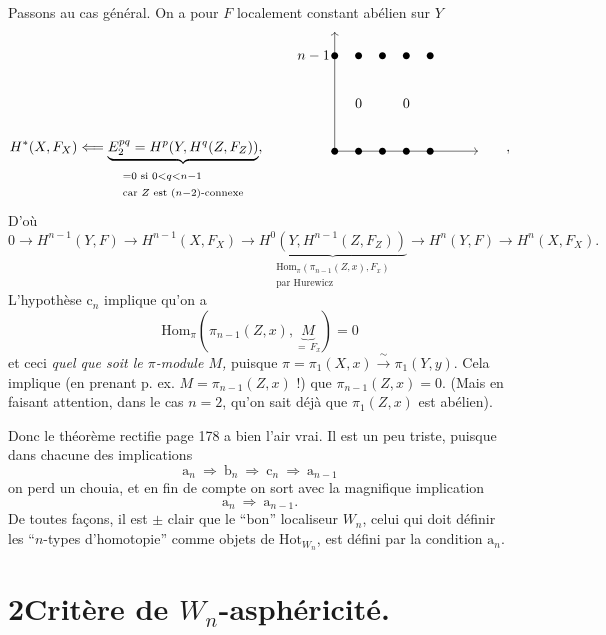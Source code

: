 \documentclass[11pt]{article}
\newcommand{\printedpage}[1]{\marginpar{\footnotesize p.~#1}}
\newcommand{\msp}[1]{\marginpar{\footnotesize [#1]}}
\begin{document}
\printedpage{124}

Passons au cas général. On a pour $F$ localement constant abélien sur $Y$
\[
H^*(X,F_X) \Longleftarrow \underbrace{E_2^{pq} = H^p(Y,H^q(Z,F_Z))}_{\begin{array}{l}\scriptstyle = 0 \text{ si } 0<q<n-1\\ \scriptstyle \text{car } Z \text{ est } (n-2)\text{-connexe}\end{array}}, \qquad
\begin{tikzpicture}[baseline=0pt, x=0.6cm, y=0.6cm]
\draw[->] (0,0) -- (0,5);
\draw[->] (0,0) -- (6,0);
\node[left] at (0,4) {$n-1$};
\foreach \i in {0,...,4} { \fill (\i,4) circle (2.5pt); \fill (\i,0) circle (2.5pt); }
\node at (1,2) {$0$};
\node at (3,2) {$0$};
\end{tikzpicture}
\qquad ,
\]
D’où
\[
0 \longrightarrow H^{n-1}(Y,F) \longrightarrow H^{n-1}(X,F_X) \longrightarrow \underbrace{H^0(Y,H^{n-1}(Z,F_Z))}_{\begin{array}{l}\scriptstyle \mathrm{Hom}_\pi(\pi_{n-1}(Z,x),F_x)\\ \scriptstyle \text{par Hurewicz}\end{array}} \longrightarrow H^n(Y,F) \longrightarrow H^n(X,F_X).
\]
L’hypothèse $\mathrm{c}_n$ implique qu’on a
\msp{page 187}
\[
\mathrm{Hom}_\pi(\pi_{n-1}(Z,x),\underbrace{M}_{=\,F_x}) = 0
\]
et ceci \textit{quel que soit le $\pi$-module $M$,} puisque $\pi = \pi_1(X,x) \xrightarrow{\ \sim\ } \pi_1(Y,y)$. Cela implique (en prenant p. ex. $M = \pi_{n-1}(Z,x)$ !) que $\pi_{n-1}(Z,x)=0$. (Mais en faisant attention, dans le cas $n=2$, qu’on sait déjà que $\pi_1(Z,x)$ est abélien).

Donc le théorème rectifie page 178 a bien l’air vrai. Il est un peu triste, puisque dans chacune des implications %
\[
\mathrm{a}_n \ \Longrightarrow\ \mathrm{b}_n \ \Longrightarrow\ \mathrm{c}_n \ \Longrightarrow\ \mathrm{a}_{n-1}
\]
on perd un chouia, et en fin de compte on sort avec la magnifique implication
\[
\mathrm{a}_n \ \Longrightarrow\ \mathrm{a}_{n-1}.
\]
De toutes façons, il est $\pm$ clair que le “bon” localiseur $W_n$, celui qui doit définir les “$n$-types d’homotopie” comme objets de $\mathrm{Hot}_{W_n}$, est défini par la condition $\mathrm{a}_n$.

\section*{2\quad Critère de $W_n$-asphéricité.}
\end{document}
